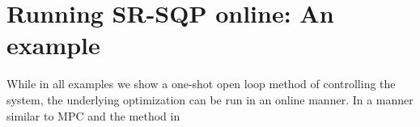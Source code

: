 \section{Running SR-SQP online: An example}
\label{sec:online}

While in all examples we show a one-shot open loop method of controlling the system, the underlying optimization can be run in an online manner. In a manner similar to MPC and the method in \cite{}
